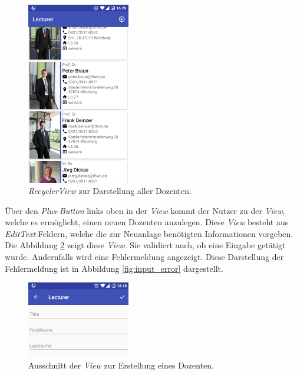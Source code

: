 \begin{figure}[H]
	\begin{center}
		\includegraphics[width=0.4\textwidth]{images/list.png}
		\caption{\textit{RecyclerView} zur Darstellung aller Dozenten.}
		\label{fig:list}
	\end{center}
\end{figure}

Über den \textit{Plus-Button} links oben in der \textit{View} kommt der Nutzer zu der \textit{View}, welche es ermöglicht, einen neuen Dozenten anzulegen. Diese \textit{View} besteht aus \textit{EditText}-Feldern, welche die zur Neuanlage benötigten Informationen vorgeben. Die Abbildung \ref{fig:input_view} zeigt diese \textit{View}. Sie validiert auch, ob eine Eingabe getätigt wurde. Andernfalls wird eine Fehlermeldung angezeigt. Diese Darstellung der Fehlermeldung ist in Abbildung \ref{fig:input_error} dargestellt.

\begin{figure}[H]
	\begin{center}
		\includegraphics[width=0.4\textwidth]{images/input_small.png}
		\caption{Ausschnitt der \textit{View} zur Erstellung eines Dozenten.}
		\label{fig:input_view}
	\end{center}
\end{figure}

